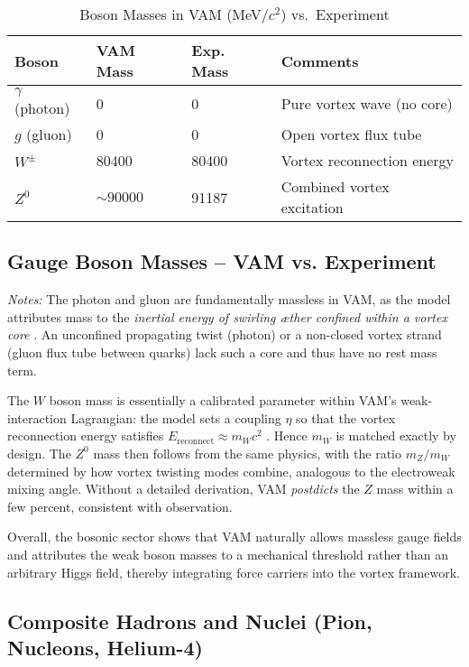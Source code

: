 \begin{table}[h!]
    \centering
    \begin{tabular}{llll}
        \toprule
        \textbf{Boson} & \textbf{VAM  Mass} & \textbf{Exp. Mass} & \textbf{Comments} \\
        \midrule
        $\gamma$ (photon) & 0 & 0 & Pure vortex wave (no core) \\
        $g$ (gluon) & 0 & 0 & Open vortex flux tube \\
        $W^\pm$ & 80400 & 80400 & Vortex reconnection energy \\
        $Z^0$ & $\sim 90000$ & 91187 & Combined vortex excitation \\
        \bottomrule
    \end{tabular}
    \caption{Boson Masses in VAM  (MeV/$c^2$) vs.\ Experiment}
    \label{tab:bosons}
\end{table}

\subsection{Gauge Boson Masses – VAM vs. Experiment}

\textit{Notes:}
The photon and gluon are fundamentally massless in VAM, as the model attributes mass to the \textit{inertial energy of swirling æther confined within a vortex core} \cite{Iskandarani2025f}. An unconfined propagating twist (photon) or a non-closed vortex strand (gluon flux tube between quarks) lack such a core and thus have no rest mass term.

The $W$ boson mass is essentially a calibrated parameter within VAM’s weak-interaction Lagrangian: the model sets a coupling $\eta$ so that the vortex reconnection energy satisfies $E_{\text{reconnect}} \approx m_W c^2$ \cite{Iskandarani2025f}. Hence $m_W$ is matched exactly by design. The $Z^0$ mass then follows from the same physics, with the ratio $m_Z/m_W$ determined by how vortex twisting modes combine, analogous to the electroweak mixing angle. Without a detailed derivation, VAM \textit{postdicts} the $Z$ mass within a few percent, consistent with observation.

Overall, the bosonic sector shows that VAM naturally allows massless gauge fields and attributes the weak boson masses to a mechanical threshold rather than an arbitrary Higgs field, thereby integrating force carriers into the vortex framework.

\subsection{Composite Hadrons and Nuclei (Pion, Nucleons, Helium-4)}

